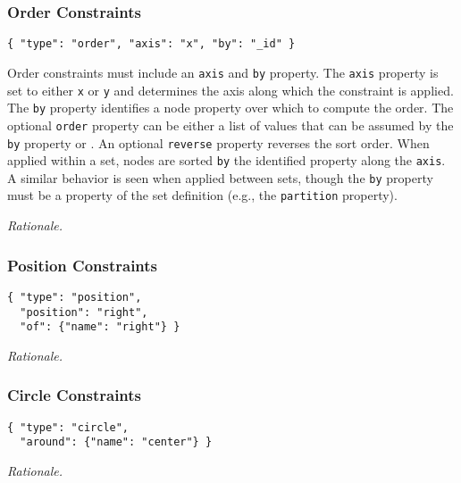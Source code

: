 \subsubsection{Order Constraints}
\begin{verbatim}
{ "type": "order", "axis": "x", "by": "_id" }
\end{verbatim}
Order constraints must include an \texttt{axis} and \texttt{by} property. The \texttt{axis} property is set to either \texttt{x} or \texttt{y} and determines the axis along which the constraint is applied. The \texttt{by} property identifies a node property over which to compute the order. The optional \texttt{order} property can be either a list of values that can be assumed by the \texttt{by} property or . An optional \texttt{reverse} property reverses the sort order. When applied within a set, nodes are sorted \texttt{by} the identified property along the \texttt{axis}. A similar behavior is seen when applied between sets, though the \texttt{by} property must be a property of the set definition (e.g., the \texttt{partition} property).

\emph{Rationale.} 

\subsubsection{Position Constraints}
\begin{verbatim}
{ "type": "position", 
  "position": "right", 
  "of": {"name": "right"} }
\end{verbatim}


\emph{Rationale.} 

\subsubsection{Circle Constraints}
\begin{verbatim}
{ "type": "circle", 
  "around": {"name": "center"} }
\end{verbatim}


\emph{Rationale.} 
